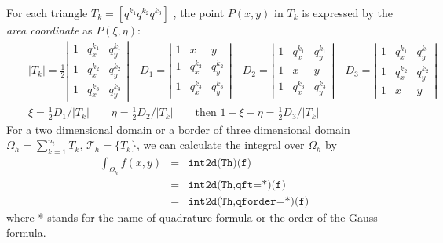 \documentclass[a4paper,twoside,12pt]{book}
\begin{document}
For each triangle $T_k=[q^{k_1}q^{k_2}q^{k_3}]$ , the point
$P(x,y)$ in $T_k$ is expressed by the \emph{area coordinate} as $P(\xi,\eta)$:
\begin{eqnarray*}
&&|T_k|=\frac12 \left|
\begin{array}{ccc}
1&q^{k_1}_x&q^{k_1}_y\\
1&q^{k_2}_x&q^{k_2}_y\\
1&q^{k_3}_x&q^{k_3}_y
\end{array}
\right|\quad
D_1=\left|
\begin{array}{ccc}
1&x&y\\
1&q^{k_2}_x&q^{k_2}_y\\
1&q^{k_3}_x&q^{k_3}_y
\end{array}
\right|
\quad
D_2=\left|
\begin{array}{ccc}
1&q^{k_1}_x&q^{k_1}_y\\
1&x&y\\
1&q^{k_3}_x&q^{k_3}_y
\end{array}
\right|
\quad
D_3=\left|
\begin{array}{ccc}
1&q^{k_1}_x&q^{k_1}_y\\
1&q^{k_2}_x&q^{k_2}_y\\
1&x&y
\end{array}
\right|\\
&&\xi=\frac12 D_1/|T_k|\qquad
\eta=\frac12 D_2/|T_k|\qquad \textrm{then }
1-\xi-\eta=\frac12 D_3/|T_k|
\end{eqnarray*}
For a two dimensional  domain or a border of three dimensional  domain  $\Omega_h=\sum_{k=1}^{n_t}T_k,\, \mathcal{T}_h=\{T_k\}$,
we can calculate the integral over $\Omega_h$ by
\begin{eqnarray*}
\int_{\Omega_h}f(x,y)&=&\texttt{int2d(Th)(f)}\\
&=&\texttt{int2d(Th,qft=*)(f)}\\
&=&\texttt{int2d(Th,qforder=*)(f)}
\end{eqnarray*}
where * stands for the name of quadrature formula or the order of the Gauss formula.
\end{document}

